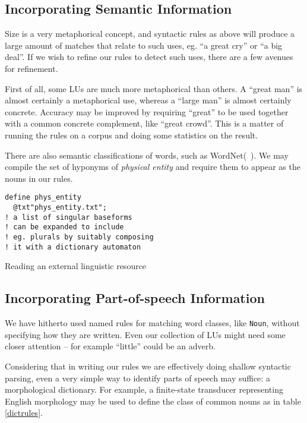\documentclass[11pt]{article}
\begin{document}
\subsection{Incorporating Semantic Information}

Size is a very metaphorical concept, and syntactic rules as above will produce a large amount of matches that relate to such uses, eg. ``a great cry'' or ``a big deal''. If we wish to refine our rules to detect such uses, there are a few avenues for refinement.

First of all, some LUs are much more metaphorical than others. A ``great man'' is almost certainly a metaphorical use, whereas a ``large man'' is almost certainly concrete. Accuracy may be improved by requiring ``great'' to be used together with a common concrete complement, like ``great crowd''. This is a matter of running the rules on a corpus and doing some statistics on the result.

There are also semantic classifications of words, such as WordNet(~). We may compile the set of hyponyms of \emph{physical entity} and require them to appear as the nouns in our rules.

\begin{table}[h]
\small
\begin{framed}
\begin{verbatim}
define phys_entity
  @txt"phys_entity.txt";
! a list of singular baseforms
! can be expanded to include
! eg. plurals by suitably composing
! it with a dictionary automaton
\end{verbatim}
\end{framed}
\normalsize
\caption{Reading an external linguistic resource}
\end{table}

\subsection{Incorporating Part-of-speech Information}

We have hitherto used named rules for matching word classes, like \verb+Noun+,
without specifying how they are written. Even our collection of LUs might need
some closer attention -- for example ``little'' could be an adverb.

Considering that in writing our
rules we are effectively doing shallow syntactic parsing, even a very simple
way to identify parts of speech may suffice: a morphological dictionary.
For example, a finite-state transducer representing English morphology may be
used to define the class of common nouns as in table \ref{dictrules}.
\end{document}
